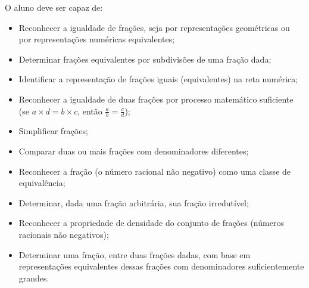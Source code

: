 \noindent O aluno deve ser capaz de:  
  
\begin{itemize} %
    \item       Reconhecer a igualdade de frações, seja por representações 
geométricas ou por representações numéricas equivalentes;
    \item       Determinar frações equivalentes por subdivisões de uma fração 
dada;
    \item       Identificar a representação de frações iguais (equivalentes) na 
reta numérica;
    \item       Reconhecer a igualdade de duas frações por processo matemático 
suficiente (se       $a \times d = b \times c$, então       $\frac{a}{b} = 
\frac{c}{d}$);
    \item       Simplificar frações;
    \item       Comparar duas ou mais frações com denominadores diferentes;
    \item       Reconhecer a fração (o número racional não negativo) como uma 
classe de equivalência;
    \item       Determinar, dada uma fração arbitrária, sua fração irredutível;
    \item       Reconhecer a propriedade de densidade do conjunto de frações 
(números racionais não negativos);
    \item       Determinar uma fração, entre duas frações dadas, com base em 
representações equivalentes dessas frações com denominadores suficientemente 
grandes.
\end{itemize} %



